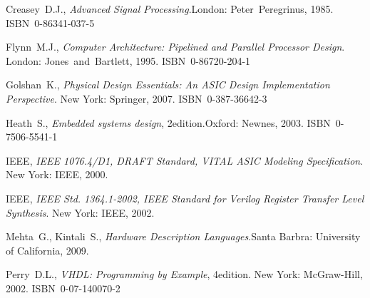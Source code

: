 \documentclass[12pt,a4paper]{article} %
\begin{document}
	
	\clearpage
	{\raggedright
	\begin{thebibliography}{99}
			Creasey~D.J.,
			\textit{Advanced Signal Processing}.\linebreak[1]
			London: Peter~Peregrinus, 1985. ISBN~0-86341-037-5
		
			Flynn~M.J.,
			\textit{Computer Architecture: Pipelined and Parallel Processor Design}.
			\linebreak[3]
			London: Jones~and~Bartlett, 1995. ISBN~0-86720-204-1
		
			Golshan~K.,
			\textit{Physical Design Essentials: An ASIC Design Implementation Perspective}.
			New York: Springer, 2007. ISBN~0-387-36642-3
		
			Heath~S.,
			\textit{Embedded systems design}, 2\nd edition.\linebreak[3]
			Oxford: Newnes, 2003. ISBN~0-7506-5541-1
		
			IEEE,
			\textit{IEEE 1076.4/D1, DRAFT Standard, VITAL ASIC Modeling Specification}.
			New York: IEEE, 2000.
		
			IEEE,
			\textit{IEEE Std. 1364.1-2002, IEEE Standard for Verilog Register Transfer Level Synthesis}.
			New York: IEEE, 2002.
		
			Mehta~G., Kintali~S.,
			\textit{Hardware Description Languages}.\linebreak[2]
			Santa Barbra: University of California,
			2009.
		
		
			Perry~D.L.,
			\textit{VHDL: Programming by Example}, 4\nth edition. \linebreak[2]
			New York: McGraw-Hill, 2002. ISBN~0-07-140070-2
		

\end{thebibliography}}
\end{document}
